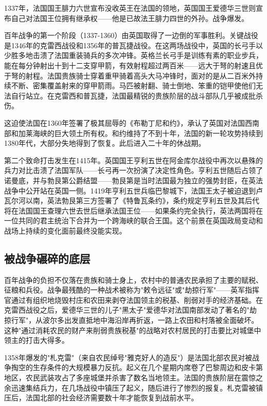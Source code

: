 \documentclass[a4paper,12pt]{ctexart}
\begin{document}
1337年，法国国王腓力六世宣布没收英王在法国的领地，英国国王爱德华三世则宣布自己对法国王位拥有继承权——他是已故法王腓力四世的外孙。战争爆发。

百年战争的第一个阶段（1337-1360）由英国取得了一边倒的军事胜利。关键战役是1346年的克雷西战役和1356年的普瓦捷战役。在这两场战役中，英国的长弓手以少胜多地击溃了法国重装骑兵的多次冲锋。英格兰长弓手是训练有素的职业步兵，能在每分钟射出十到十二支穿甲箭，有效射程超过两百米——远大于弩的射速且优于弩的射程。法国贵族骑士穿着重甲骑着高头大马冲锋时，面对的是从二百米外持续不断、密集覆盖射来的穿甲箭雨。马匹被射翻、骑士倒地、笨重的铠甲使他们无法自行站立。在克雷西和普瓦捷，法国最精锐的贵族阶层的战斗部队几乎被成批杀伤。

这迫使法国在1360年签署了极其屈辱的《布勒丁尼和约》，承认了英国对法国西南部和加莱海峡的巨大领土所有权。和约维持了不到十年，法国的新一轮攻势持续到1380年代，大部分失地得到了恢复。此后进入二十年的休战期。

第二个致命打击发生在1415年。英国国王亨利五世在阿金库尔战役中再次以悬殊的兵力对比击溃了法国军队——长弓再一次扮演了决定性角色。亨利五世随后占领了诺曼底，并与勃艮第公爵结盟——勃艮第是当时法国最为独立的强势封臣，在英法战争中公开站在英国一侧。1419年亨利五世兵临巴黎城下，法国王太子被迫退到卢瓦尔河以南，英法勃艮第三方签署了《特鲁瓦条约》，条约规定亨利五世及其后代将在法国国王查理六世去世后继承法国王位——如果条约完全执行，英法两国将在一位共同的君主统治下合并为一个跨海峡的联合王国。这个前景在英国政局变动和战场上持续的变化面前最终没能实现。

\subsection{被战争碾碎的底层}

百年战争的负担不仅落在贵族和骑士身上，农村中的普通农民承担了主要的赋税、征粮和兵役。战争最残酷的一种战术被称为"敕令远征"或"劫掠行军"——英军指挥官通过有组织地烧毁村庄和农田来剥夺法国领主的税基、削弱对手的经济基础。在克雷西战役之后，爱德华三世的儿子"黑太子"爱德华对法国南部发动了著名的"劫掠行军"，从波尔多出发直抵地中海沿岸再折返，一路上农田和村落被全面破坏。这种"通过消耗农民的财产来削弱贵族税基"的战略对农村居民的打击要比对城堡中领主的打击大得多。

1358年爆发的"札克雷"（来自农民绰号"雅克好人的造反"）是法国北部农民对被战争掏空的生存条件的大规模暴力反抗。起义在几个星期内席卷了巴黎周边和皮卡第地区，农民武装攻占了多座城堡并杀害了数名当地领主。法国的贵族阶层在震惊之余迅速集结兵力，在几场战役中镇压了起义，随后进行了惨烈的报复。札克雷被镇压后，法国北部的社会经济需要数十年才能恢复到战前水平。
\end{document}
